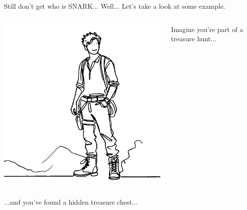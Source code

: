 \documentclass{zkdl-presentation-template}
\begin{document}
    \begin{frame}{Still don't get who is SNARK...}
        Well... Let's take a look at some example. 

        \begin{columns}
            \begin{column}{0.2\textwidth}
                \includegraphics[width=\linewidth]{../presentations/images/lecture_8/urtreasurehunter.png}
            \end{column}
    
            \begin{column}{0.7\textwidth}
                Imagine you're part of a treasure hunt...
            \end{column}
        \end{columns}

        

        \begin{columns}
            \begin{column}{0.7\textwidth}
                ...and you've found a hidden treasure chest...
            \end{column}


\end{columns}
\end{frame}
\end{document}
